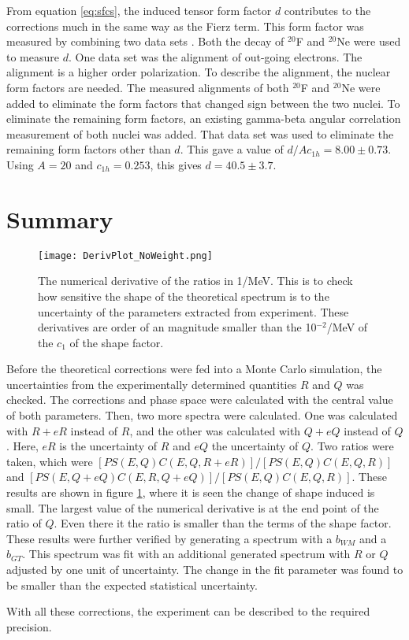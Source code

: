 \documentclass[../MaxHughesThesis.tex]{subfiles}
\begin{document}
From equation \ref{eq:sfcs}, the induced tensor form factor $d$ contributes to the corrections much in the same way as the Fierz term.
This form factor was measured by combining two data sets \cite{Min11}.
Both the decay of $^{20}$F and $^{20}$Ne were used to measure $d$.
One data set was the alignment of out-going electrons.
The alignment is a higher order polarization.
To describe the alignment, the nuclear form factors are needed.  
The measured alignments of both $^{20}$F and $^{20}$Ne were added to eliminate the form factors that changed sign between the two nuclei.
To eliminate the remaining form factors, an existing gamma-beta angular correlation measurement of both nuclei was added. 
That data set was used to eliminate the remaining form factors other than $d$.
This gave a value of $d/Ac_{1h} = 8.00 \pm 0.73$.
Using $A = 20$ and $c_{1h} = 0.253$, this gives $d = 40.5 \pm 3.7$. 

\section{Summary}

\begin{figure}[!htb]
	\centerline{\texttt{[image: DerivPlot\_NoWeight.png]}}
	\caption{The numerical derivative of the ratios in 1/MeV.
		 This is to check how sensitive the shape of the theoretical spectrum is to the uncertainty of the parameters extracted from experiment. 
		 These derivatives are order of an magnitude smaller than the 10$^{-2}$/MeV of the $c_{1}$ of the shape factor.}
	\label{fig:theoryuncer}
\end{figure}

Before the theoretical corrections were fed into a Monte Carlo simulation, the uncertainties from the experimentally determined quantities $R$ and $Q$ was checked.
The corrections and phase space were calculated with the central value of both parameters.
Then, two more spectra were calculated.
One was calculated with $R + eR$ instead of $R$, and the other was calculated with $Q + eQ$ instead of $Q$.
Here, $eR$ is the uncertainty of $R$ and $eQ$ the uncertainty of $Q$.
Two ratios were taken, which were $[PS(E,Q)C(E,Q,R+eR)]/[PS(E,Q)C(E,Q,R)]$ and $[PS(E,Q+eQ)C(E,R,Q+eQ)]/[PS(E,Q)C(E,Q,R)]$.
These results are shown in figure \ref{fig:theoryuncer}, where it is seen the change of shape induced is small.
The largest value of the numerical derivative is at the end point of the ratio of  $Q$. 
Even there it the ratio is smaller than the terms of the shape factor.
These results were further verified by generating a spectrum with a $b_{WM}$ and a $b_{GT}$.
This spectrum was fit with an additional generated spectrum with $R$ or $Q$ adjusted by one unit of uncertainty.
The change in the fit parameter was found to be smaller than the expected statistical uncertainty.

With all these corrections, the experiment can be described to the required precision.
\end{document}
